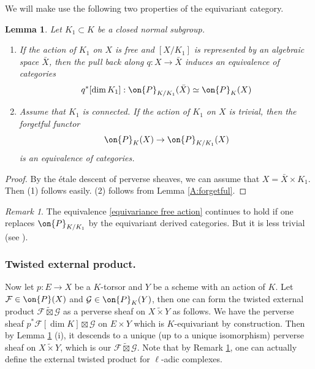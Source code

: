 \documentclass[]{pcmi}
\theoremstyle{plain}
\newtheorem{lem}[equation]{Lemma}
\theoremstyle{remark}
\newtheorem{rmk}[equation]{Remark}
\theoremstyle{definition}
\newcommand{\mF}{{\mathcal F}}
\newcommand{\mG}{{\mathcal G}}
\begin{document}
We will make use the following two properties of the equivariant category. 
\begin{lem}\label{A:unip}
Let $K_1\subset K$ be a closed normal subgroup. 
\begin{enumerate}
\item If the action of $K_1$ on $X$ is free and $[X/K_1]$ is represented by an algebraic space $\bar X$, then the pull back along $q:X\to \bar X$ induces an equivalence of categories 
\begin{equation}\label{equivariance free action}
q^*[\dim K_1]:\on{P}_{K/K_1}(\bar X)\simeq \on{P}_K(X)
\end{equation}

\item Assume that $K_1$ is connected. If the action of $K_1$ on $X$ is trivial, then the forgetful functor
\begin{equation}\label{unipotence}
\on{P}_K(X)\to \on{P}_{K/K_1}(X)
\end{equation}
is an equivalence of categories.
\end{enumerate}
\end{lem}
\begin{proof}By the \'etale descent of perverse sheaves, we can assume that $X=\bar X\times K_1$. Then (1) follows easily.
 (2) follows from Lemma \ref{A:forgetful}.
\end{proof}
\begin{rmk}\label{equivariant descent}
The equivalence \eqref{equivariance free action} continues to hold if one replaces $\on{P}_{K/K_1}$ by the equivariant derived categories. But it is less trivial (see \cite[\S\ 2.6.2]{BeLu}).
\end{rmk}

\subsubsection{Twisted external product.}\label{A:twist product}
Now let $p:E\to X$ be a $K$-torsor and $Y$ be a scheme with an action of $K$. Let $\mF\in\on{P}(X)$ and $\mG\in \on{P}_K(Y)$, then one can form the twisted external product $\mF\tilde\boxtimes\mG$ as a perverse sheaf on $X\tilde\times Y$ as follows. We have the perverse sheaf $p^*\mF[\dim K]\boxtimes \mG$ on $E\times Y$ which is $K$-equivariant by construction. Then by Lemma \ref{A:unip} (i), it descends to a unique (up to a unique isomorphism) perverse sheaf on $X\tilde\times Y$, which is our $\mF\tilde\boxtimes\mG$. Note that by Remark \ref{equivariant descent}, one can actually define the external twisted product for $\ell$-adic complexes.
\end{document}
